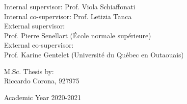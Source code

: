{\begin{center}
\vspace{1.5cm}

\end{center}


\vspace{1.5cm}
\large
\begin{flushleft}
Internal supervisor: Prof. Viola Schiaffonati\\
Internal co-supervisor: Prof. Letizia Tanca\\
\vspace{5mm}
External supervisor:\\Prof. Pierre Senellart (\'Ecole normale sup\'erieure)\\
External co-supervisor:\\Prof. Karine Gentelet (Universit\'e du Qu\'ebec en Outaouais)\\
\end{flushleft}

\vspace{1cm}

\begin{flushright}
M.Sc. Thesis by:\\
Riccardo Corona, 927975\\
\end{flushright}

\vspace{1.5cm}

\begin{center}
Academic Year 2020-2021
\end{center}

\clearpage
}
